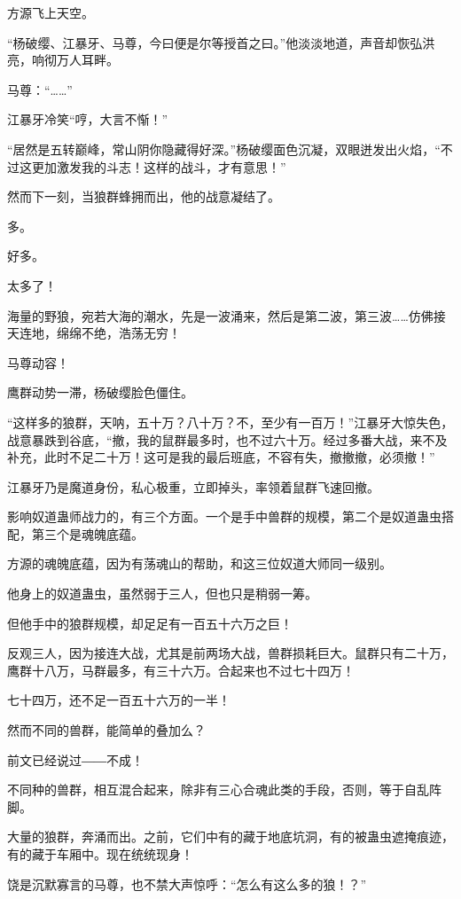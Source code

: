 
\begin{this_body}

方源飞上天空。

“杨破缨、江暴牙、马尊，今曰便是尔等授首之曰。”他淡淡地道，声音却恢弘洪亮，响彻万人耳畔。

马尊：“……”

江暴牙冷笑“哼，大言不惭！”

“居然是五转巅峰，常山阴你隐藏得好深。”杨破缨面色沉凝，双眼迸发出火焰，“不过这更加激发我的斗志！这样的战斗，才有意思！”

然而下一刻，当狼群蜂拥而出，他的战意凝结了。

多。

好多。

太多了！

海量的野狼，宛若大海的潮水，先是一波涌来，然后是第二波，第三波……仿佛接天连地，绵绵不绝，浩荡无穷！

马尊动容！

鹰群动势一滞，杨破缨脸色僵住。

“这样多的狼群，天呐，五十万？八十万？不，至少有一百万！”江暴牙大惊失色，战意暴跌到谷底，“撤，我的鼠群最多时，也不过六十万。经过多番大战，来不及补充，此时不足二十万！这可是我的最后班底，不容有失，撤撤撤，必须撤！”

江暴牙乃是魔道身份，私心极重，立即掉头，率领着鼠群飞速回撤。

影响奴道蛊师战力的，有三个方面。一个是手中兽群的规模，第二个是奴道蛊虫搭配，第三个是魂魄底蕴。

方源的魂魄底蕴，因为有荡魂山的帮助，和这三位奴道大师同一级别。

他身上的奴道蛊虫，虽然弱于三人，但也只是稍弱一筹。

但他手中的狼群规模，却足足有一百五十六万之巨！

反观三人，因为接连大战，尤其是前两场大战，兽群损耗巨大。鼠群只有二十万，鹰群十八万，马群最多，有三十六万。合起来也不过七十四万！

七十四万，还不足一百五十六万的一半！

然而不同的兽群，能简单的叠加么？

前文已经说过――不成！

不同种的兽群，相互混合起来，除非有三心合魂此类的手段，否则，等于自乱阵脚。

大量的狼群，奔涌而出。之前，它们中有的藏于地底坑洞，有的被蛊虫遮掩痕迹，有的藏于车厢中。现在统统现身！

饶是沉默寡言的马尊，也不禁大声惊呼：“怎么有这么多的狼！？”


\end{this_body}
